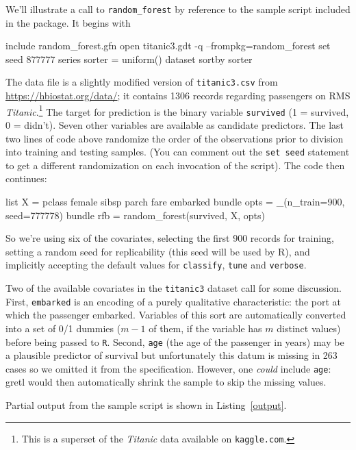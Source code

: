 \documentclass{article}
\begin{document}
We'll illustrate a call to \texttt{random\_forest} by reference to the
sample script included in the package.  It begins with
%
\begin{code}
include random_forest.gfn
open titanic3.gdt -q --frompkg=random_forest
set seed 877777
series sorter = uniform()
dataset sortby sorter
\end{code}
%
The data file is a slightly modified version of \texttt{titanic3.csv}
from \url{https://hbiostat.org/data/}; it contains 1306 records
regarding passengers on RMS \textit{Titanic}.\footnote{This is a
  superset of the \textit{Titanic} data available on
  \texttt{kaggle.com}.}  The target for prediction is the binary
variable \texttt{survived} (1 = survived, 0 = didn't). Seven other
variables are available as candidate predictors.  The last two lines
of code above randomize the order of the observations prior to
division into training and testing samples.  (You can comment out the
\texttt{set seed} statement to get a different randomization on each
invocation of the script).  The code then continues:
%
\begin{code}
list X = pclass female sibsp parch fare embarked
bundle opts = _(n_train=900, seed=777778)
bundle rfb = random_forest(survived, X, opts)
\end{code}
%
So we're using six of the covariates, selecting the first 900 records
for training, setting a random seed for replicability (this seed will
be used by \textsf{R}), and implicitly accepting the default values
for \texttt{classify}, \texttt{tune} and \texttt{verbose}.

Two of the available covariates in the \texttt{titanic3} dataset call
for some discussion. First, \texttt{embarked} is an encoding of a
purely qualitative characteristic: the port at which the passenger
embarked. Variables of this sort are automatically converted into a
set of 0/1 dummies ($m-1$ of them, if the variable has $m$ distinct
values) before being passed to \texttt{R}. Second, \texttt{age} (the
age of the passenger in years) may be a plausible predictor of
survival but unfortunately this datum is missing in 263 cases so we
omitted it from the specification. However, one \textit{could} include
\texttt{age}: gretl would then automatically shrink the sample to skip
the missing values.

Partial output from the sample script is shown in
Listing~\ref{output}.
\end{document}

